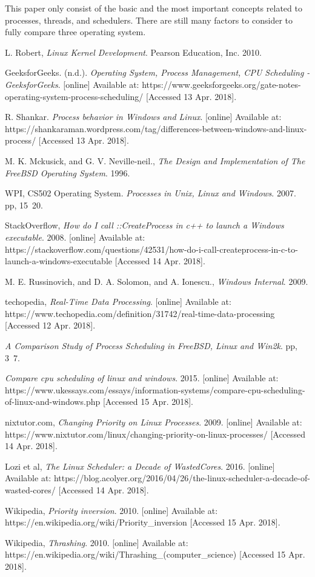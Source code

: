 \documentclass[10pt,draftclsnofoot,journal,compsoc,onecolumn]{IEEEtran}
\begin{document}
This paper only consist of the basic and the most important concepts related to processes, threads, and schedulers. There are still many factors to consider to fully compare three operating system.

\newpage
\begin{thebibliography}{14}

L. Robert, \textit{Linux Kernel Development}. Pearson Education, Inc. 2010.

GeeksforGeeks. (n.d.). \textit{Operating System, Process Management, CPU Scheduling - GeeksforGeeks}. [online] Available at: https://www.geeksforgeeks.org/gate-notes-operating-system-process-scheduling/ [Accessed 13 Apr. 2018].

R. Shankar. \textit{Process behavior in Windows and Linux}. [online] Available at: https://shankaraman.wordpress.com/tag/differences-between-windows-and-linux-process/ [Accessed 13 Apr. 2018].

M. K. Mckusick, and G. V. Neville-neil., \textit{The Design and Implementation of The FreeBSD Operating System}. 1996.

WPI, CS502 Operating System. \textit{Processes in Unix, Linux and Windows}. 2007. pp, 15~20.

StackOverflow, \textit{How do I call ::CreateProcess in c++ to launch a Windows executable}. 2008. [online] Available at: https://stackoverflow.com/questions/42531/how-do-i-call-createprocess-in-c-to-launch-a-windows-executable [Accessed 14 Apr. 2018].

M. E. Russinovich, and D. A. Solomon, and A. Ionescu., \textit{Windows Internal}. 2009.

techopedia, \textit{Real-Time Data Processing}. [online] Available at: https://www.techopedia.com/definition/31742/real-time-data-processing [Accessed 12 Apr. 2018].

\textit{A Comparison Study of Process Scheduling in FreeBSD, Linux and Win2k}. pp, 3~7.

\textit{Compare cpu scheduling of linux and windows}. 2015. [online] Available at: https://www.ukessays.com/essays/information-systems/compare-cpu-scheduling-of-linux-and-windows.php [Accessed 15 Apr. 2018].

nixtutor.com, \textit{Changing Priority on Linux Processes}. 2009. [online] Available at: https://www.nixtutor.com/linux/changing-priority-on-linux-processes/ [Accessed 14 Apr. 2018].

Lozi et al, \textit{The Linux Scheduler: a Decade of WastedCores}. 2016. [online] Available at: https://blog.acolyer.org/2016/04/26/the-linux-scheduler-a-decade-of-wasted-cores/ [Accessed 14 Apr. 2018].

Wikipedia, \textit{Priority inversion}. 2010. [online] Available at: https://en.wikipedia.org/wiki/Priority\_inversion [Accessed 15 Apr. 2018]. 

Wikipedia, \textit{Thrashing}. 2010. [online] Available at: https://en.wikipedia.org/wiki/Thrashing\_(computer\_science) [Accessed 15 Apr. 2018].

\end{thebibliography}
\end{document}
